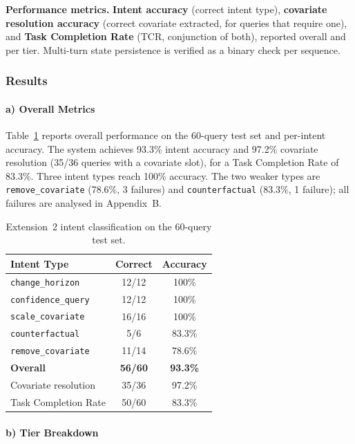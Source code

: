 \documentclass[conference]{IEEEtran}
\begin{document}
\textbf{Performance metrics.}
\textbf{Intent accuracy} (correct intent type), \textbf{covariate resolution accuracy} (correct covariate extracted, for queries that require one), and \textbf{Task Completion Rate} (TCR, conjunction of both), reported overall and per tier. Multi-turn state persistence is verified as a binary check per sequence.

\subsubsection{Results}

\paragraph*{a) Overall Metrics}

Table~\ref{tab:ext2_metrics} reports overall performance on the 60-query test set and per-intent accuracy. The system achieves 93.3\% intent accuracy and 97.2\% covariate resolution (35/36 queries with a covariate slot), for a Task Completion Rate of 83.3\%. Three intent types reach 100\% accuracy. The two weaker types are \texttt{remove\_covariate} (78.6\%, 3 failures) and \texttt{counterfactual} (83.3\%, 1 failure); all failures are analysed in Appendix~B.

\begin{table}[h]
\centering
\caption{Extension~2 intent classification on the 60-query test set.}
\label{tab:ext2_metrics}
\begin{tabular}{lcc}
\toprule
Intent Type & Correct & Accuracy \\
\midrule
\texttt{change\_horizon}   & 12/12 & 100\% \\
\texttt{confidence\_query} & 12/12 & 100\% \\
\texttt{scale\_covariate}  & 16/16 & 100\% \\
\texttt{counterfactual}    & 5/6   & 83.3\% \\
\texttt{remove\_covariate} & 11/14 & 78.6\% \\
\midrule
\textbf{Overall}           & \textbf{56/60} & \textbf{93.3\%} \\
Covariate resolution       & 35/36 & 97.2\% \\
Task Completion Rate       & 50/60 & 83.3\% \\
\bottomrule
\end{tabular}
\end{table}

\paragraph*{b) Tier Breakdown}
\end{document}
